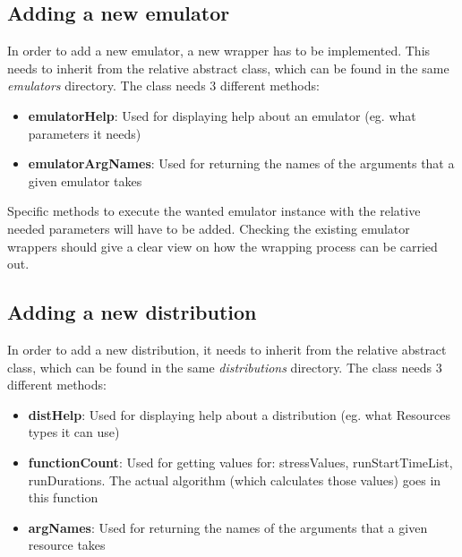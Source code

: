 \documentclass[letterpaper,10pt,english]{sphinxhowto}
\begin{document}
\subsection{Adding a new emulator}
\label{COCOMA/09_adding_distributions_emulators::doc}\label{COCOMA/09_adding_distributions_emulators:adding-a-new-emulator}
In order to add a new emulator, a new wrapper has to be implemented. This needs to inherit from the relative abstract class, which can be found in the same \emph{emulators} directory. The class needs 3 different methods:
\begin{itemize}
\item {} 
\textbf{emulatorHelp}: Used for displaying help about an emulator (eg. what parameters it needs)

\item {} 
\textbf{emulatorArgNames}: Used for returning the names of the arguments that a given emulator takes

\end{itemize}

Specific methods to execute the wanted emulator instance with the relative needed parameters will have to be added. Checking the existing emulator wrappers should give a clear view on how the wrapping process can be carried out.


\subsection{Adding a new distribution}
\label{COCOMA/09_adding_distributions_emulators:adding-a-new-distribution}
In order to add a new distribution, it needs to inherit from the relative abstract class, which can be found in the same \emph{distributions} directory. The class needs 3 different methods:
\begin{itemize}
\item {} 
\textbf{distHelp}: Used for displaying help about a distribution (eg. what Resources types it can use)

\item {} 
\textbf{functionCount}: Used for getting values for: stressValues, runStartTimeList, runDurations. The actual algorithm (which calculates those values) goes in this function

\item {} 
\textbf{argNames}: Used for returning the names of the arguments that a given resource takes

\end{itemize}
\end{document}
